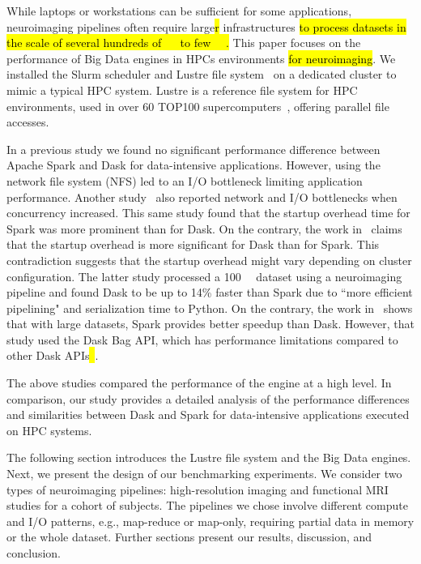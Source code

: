 \documentclass[AMA,STIX1COL]{WileyNJD-v2}
\newcommand{\HL}[1]{\hl{#1}}
\begin{document}
While laptops or workstations can be sufficient for some applications, 
neuroimaging pipelines often require large\HL{r} infrastructures
\HL{to process datasets in the scale of several hundreds of {\SI{}{\gibi\byte}} to few {\SI{}{\tebi\byte}}.}
This paper focuses on the performance of Big Data engines in HPCs environments \HL{for neuroimaging}.
We installed the Slurm scheduler and Lustre file system~\cite{Braam2019TheLS} on a dedicated cluster to mimic a typical HPC system.
Lustre is a reference file system for HPC environments, used in over 60 TOP100 supercomputers~{\cite{OpenSFS-lustre}}, offering parallel file accesses.
			
In a previous study\cite{8943502} we found no significant performance difference between Apache Spark and Dask for data-intensive applications.
However, using the network file system (NFS) led to an I/O bottleneck limiting application performance.
Another study~\cite{8588652} also reported network and I/O bottlenecks when concurrency increased.
This same study found that the startup overhead time for Spark was more prominent than for Dask.
On the contrary, the work in~\cite{Mehta:17} claims that the startup overhead is more significant for Dask than for Spark.
This contradiction suggests that the startup overhead might vary depending on cluster configuration.
The latter study processed a \SI{100}{\giga\byte} dataset using a neuroimaging pipeline and found Dask to be up to 14\% faster than Spark due to ``more efficient pipelining" and serialization time to Python.
On the contrary, the work in~\cite{10.1145/3225058.3225128} shows that with large datasets, Spark provides better speedup than Dask.
However, that study used the Dask Bag API, which has performance limitations compared to other Dask APIs\HL{{~\cite{DaskBagDoc}}}.
			
The above studies compared the performance of the engine at a high level.
In comparison, our study provides a detailed analysis of the performance differences
and similarities between Dask and Spark for data-intensive applications executed on HPC systems.
			
The following section introduces the Lustre file system and the Big Data engines.
Next, we present the design of our benchmarking experiments.
We consider two types of neuroimaging pipelines: high-resolution imaging and functional MRI studies for a cohort of subjects.
The pipelines we chose involve different compute and I/O patterns, e.g., map-reduce or map-only, requiring partial data in memory or the whole dataset.
Further sections present our results, discussion, and conclusion.
			
\end{document}
